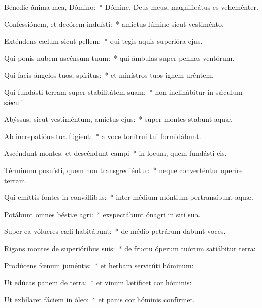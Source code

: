 \item Bénedic ánima mea, Dómino:~* Dómine, Deus meus, magnificátus es veheménter.

\item Confessiónem, et decórem induísti:~* amíctus lúmine sicut vestiménto.

\item Exténdens cælum sicut pellem:~* qui tegis aquis superióra ejus.

\item Qui ponis nubem ascénsum tuum:~* qui ámbulas super pennas ventórum.

\item Qui facis ángelos tuos, spíritus:~* et minístros tuos ignem uréntem.

\item Qui fundásti terram super stabilitátem suam:~* non inclinábitur in sǽculum sǽculi.

\item Abýssus, sicut vestiméntum, amíctus ejus:~* super montes stabunt aquæ.

\item Ab increpatióne tua fúgient:~* a voce tonítrui tui formidábunt.

\item Ascéndunt montes: et descéndunt campi~* in locum, quem fundásti eis.

\item Términum posuísti, quem non transgrediéntur:~* neque converténtur operíre terram.

\item Qui emíttis fontes in convállibus:~* inter médium móntium pertransíbunt aquæ.

\item Potábunt omnes béstiæ agri:~* exspectábunt ónagri in siti sua.

\item Super ea vólucres cæli habitábunt:~* de médio petrárum dabunt voces.

\item Rigans montes de superióribus suis:~* de fructu óperum tuórum satiábitur terra:

\item Prodúcens fœnum juméntis:~* et herbam servitúti hóminum:

\item Ut edúcas panem de terra:~* et vinum lætíficet cor hóminis:

\item Ut exhílaret fáciem in óleo:~* et panis cor hóminis confírmet.

